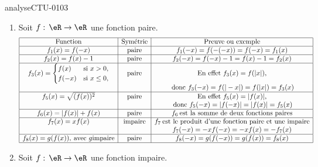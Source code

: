 
\begin{corrige}{analyseCTU-0103}

  \begin{enumerate}
  \item Soit $f:\,\eR\to\eR$ une fonction paire.
      \begin{equation*}
        \begin{array}{|c|c|c|}
         \hline
         \text{Function} & \text{Sym\'etrie} & \text{Preuve ou exemple}\\
          \hline
            f_1 (x) = f(-x) & \text{paire} & f_1 (-x) = f(-(-x)) = f(-x) = f_1(x) \\
            \hline
            f_2 (x) = f(x)-1 & \text{paire} & f_2 (-x) = f(-x)-1 =f(x)-1 = f_2(x) \\
            \hline
            f_3 (x)= 
            \begin{cases}
              f(x) &\text{si } x>0, \\
              f(-x)& \text{si } x\leq 0,
            \end{cases} &\text{paire} & \text{En effet } f_3(x) = f(|x|),\\
            && \:\text{donc } f_3(-x) = f(|-x|)= f(|x|) = f_3 (x) \\
            \hline
            f_5(x) = \sqrt{(f(x))^2} &\text{paire}& \text{En effet } f_5(x) = |f(x)|,\\
            && \:\text{donc } f_5(-x) = |f(-x)| = |f(x)| = f_5(x)\\
            \hline
            f_6(x)= |f(x)| + f(x) &\text{paire}& f_6 \: \text{est la somme de deux fonctions paires} \\
            \hline
            f_7(x) = xf(x)&\text{impaire}& f_7 \: \text{est le produit d'une fonction paire et une impaire} \\
            &&f_7(-x) = -xf(-x) = -xf(x) = -f_7(x)\\
            \hline
            f_8(x) = g(f(x)), \:\text{avec }g \text{impaire} &\text{paire}& f_8(-x) = g(f(-x))= g(f(x))=f_8(x) \\
\hline
        \end{array}
      \end{equation*}
\item  Soit $f:\,\eR\to\eR$ une fonction impaire.
      \begin{equation*}

\end{equation*}
\end{enumerate}
\end{corrige}

